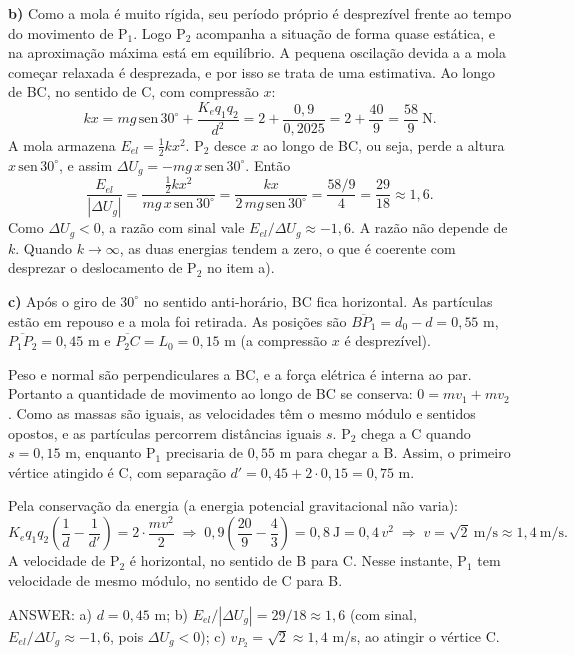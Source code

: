 \documentclass{article}%
\begin{document}
\textbf{b)} Como a mola é muito rígida, seu período próprio é desprezível frente ao tempo do movimento de P$_1$. Logo P$_2$ acompanha a situação de forma quase estática, e na aproximação máxima está em equilíbrio. A pequena oscilação devida a a mola começar relaxada é desprezada, e por isso se trata de uma estimativa. Ao longo de BC, no sentido de C, com compressão $x$:
\[
kx = mg\,\text{sen}\,30^\circ + \frac{K_e q_1 q_2}{d^2} = 2+\frac{0{,}9}{0{,}2025}=2+\frac{40}{9}=\frac{58}{9}\ \text{N}.
\]
A mola armazena $E_{el}=\tfrac12 kx^2$. P$_2$ desce $x$ ao longo de BC, ou seja, perde a altura $x\,\text{sen}\,30^\circ$, e assim $\Delta U_g=-mg\,x\,\text{sen}\,30^\circ$. Então
\[
\frac{E_{el}}{|\Delta U_g|}=\frac{\tfrac12 kx^2}{mg\,x\,\text{sen}\,30^\circ}=\frac{kx}{2\,mg\,\text{sen}\,30^\circ}=\frac{58/9}{4}=\frac{29}{18}\approx 1{,}6 .
\]
Como $\Delta U_g<0$, a razão com sinal vale $E_{el}/\Delta U_g\approx -1{,}6$. A razão não depende de $k$. Quando $k\to\infty$, as duas energias tendem a zero, o que é coerente com desprezar o deslocamento de P$_2$ no item a).

\textbf{c)} Após o giro de $30^\circ$ no sentido anti-horário, BC fica horizontal. As partículas estão em repouso e a mola foi retirada. As posições são $\overline{BP_1}=d_0-d=0{,}55$ m, $\overline{P_1P_2}=0{,}45$ m e $\overline{P_2C}=L_0=0{,}15$ m (a compressão $x$ é desprezível).

Peso e normal são perpendiculares a BC, e a força elétrica é interna ao par. Portanto a quantidade de movimento ao longo de BC se conserva: $0=mv_1+mv_2$. Como as massas são iguais, as velocidades têm o mesmo módulo e sentidos opostos, e as partículas percorrem distâncias iguais $s$. P$_2$ chega a C quando $s=0{,}15$ m, enquanto P$_1$ precisaria de $0{,}55$ m para chegar a B. Assim, o primeiro vértice atingido é C, com separação $d'=0{,}45+2\cdot 0{,}15=0{,}75$ m.

Pela conservação da energia (a energia potencial gravitacional não varia):
\[
K_e q_1 q_2\left(\frac{1}{d}-\frac{1}{d'}\right)=2\cdot\frac{m v^2}{2}
\;\Rightarrow\; 0{,}9\left(\frac{20}{9}-\frac{4}{3}\right)=0{,}8\ \text{J}=0{,}4\,v^2
\;\Rightarrow\; v=\sqrt{2}\ \text{m/s}\approx 1{,}4\ \text{m/s}.
\]
A velocidade de P$_2$ é horizontal, no sentido de B para C. Nesse instante, P$_1$ tem velocidade de mesmo módulo, no sentido de C para B.

ANSWER: a) $d=0{,}45$ m; b) $E_{el}/|\Delta U_g|=29/18\approx 1{,}6$ (com sinal, $E_{el}/\Delta U_g\approx -1{,}6$, pois $\Delta U_g<0$); c) $v_{P_2}=\sqrt{2}\approx 1{,}4$ m/s, ao atingir o vértice C.%
\newpage%
\end{document}
